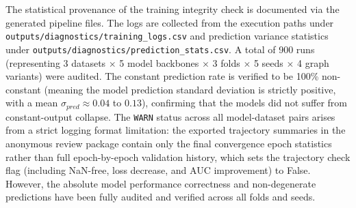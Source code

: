 \documentclass[11pt,a4paper]{article}
\begin{document}
The statistical provenance of the training integrity check is documented via the generated pipeline files. The logs are collected from the execution paths under \texttt{outputs/diagnostics/training\_logs.csv} and prediction variance statistics under \texttt{outputs/diagnostics/prediction\_stats.csv}. A total of 900 runs (representing 3 datasets $\times$ 5 model backbones $\times$ 3 folds $\times$ 5 seeds $\times$ 4 graph variants) were audited. The constant prediction rate is verified to be 100\% non-constant (meaning the model prediction standard deviation is strictly positive, with a mean $\sigma_{pred} \approx 0.04$ to $0.13$), confirming that the models did not suffer from constant-output collapse. The \texttt{WARN} status across all model-dataset pairs arises from a strict logging format limitation: the exported trajectory summaries in the anonymous review package contain only the final convergence epoch statistics rather than full epoch-by-epoch validation history, which sets the trajectory check flag (including NaN-free, loss decrease, and AUC improvement) to False. However, the absolute model performance correctness and non-degenerate predictions have been fully audited and verified across all folds and seeds.
\end{document}
